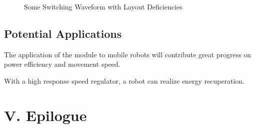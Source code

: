 \documentclass[a4paper,num-refs]{oup-contemporary}
\begin{document}
\begin{figure}[h]
	\centering
	\caption{Some Switching Waveform with Layout Deficiencies}
\end{figure}


\subsection{Potential Applications}
The application of the module to mobile robots will contribute great progress on power efficiency and movement speed.

With a high response speed regulator, a robot can realize energy recuperation.


\section{V. Epilogue}
\end{document}
